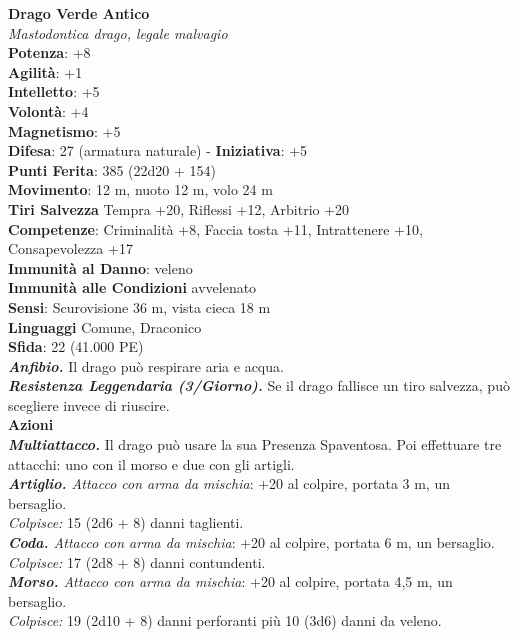 \begin{multicols}{2}
\medskip\textbf{Drago Verde Antico}\\
\emph{Mastodontica drago, legale malvagio} \\
\textbf{Potenza}: +8\\
\textbf{Agilità}: +1\\
\textbf{Intelletto}: +5\\
\textbf{Volontà}: +4\\
\textbf{Magnetismo}: +5\\
\textbf{Difesa}: 27 (armatura naturale) - \textbf{Iniziativa}: +5\\
\textbf{Punti Ferita}: 385 (22d20 + 154)\\
\textbf{Movimento}: 12 m, nuoto 12 m, volo 24 m\\
\textbf{Tiri Salvezza} Tempra +20, Riflessi +12, Arbitrio +20\\
\textbf{Competenze}: Criminalità +8, Faccia tosta +11, Intrattenere +10, Consapevolezza +17\\
\textbf{Immunità al Danno}: veleno\\
\textbf{Immunità alle Condizioni} avvelenato\\
\textbf{Sensi}: Scurovisione 36 m, vista cieca 18 m\\
\textbf{Linguaggi} Comune, Draconico\\
\textbf{Sfida}: 22 (41.000 PE)\smallskip\\
\emph{\textbf{Anfibio.}} Il drago può respirare aria e acqua.\\
\emph{\textbf{Resistenza Leggendaria (3/Giorno).}} Se il drago fallisce un tiro salvezza, può scegliere invece di riuscire.\\
\smallskip\textbf{Azioni}\\
\emph{\textbf{Multiattacco.}} Il drago può usare la sua Presenza Spaventosa. Poi effettuare tre attacchi: uno con il morso e due con gli artigli.\\
\emph{\textbf{Artiglio.} Attacco con arma da mischia}: +20 al colpire, portata 3 m, un bersaglio.\\
\emph{Colpisce:} 15 (2d6 + 8) danni taglienti.\\
\emph{\textbf{Coda.} Attacco con arma da mischia}: +20 al colpire, portata 6 m, un bersaglio.\\
\emph{Colpisce:} 17 (2d8 + 8) danni contundenti.\\
\emph{\textbf{Morso.} Attacco con arma da mischia}: +20 al colpire, portata 4,5 m, un bersaglio.\\
\emph{Colpisce:} 19 (2d10 + 8) danni perforanti più 10 (3d6) danni da veleno.\\

\end{multicols}
